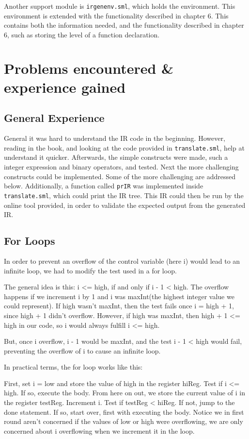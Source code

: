 \documentclass{article}
\begin{document}
Another support module is \texttt{irgenenv.sml}, which holds the environment. This environment is extended with the functionality described in chapter 6. This contains both the information needed, and the functionality described in chapter 6, such as storing the level of a function declaration.

\section{Problems encountered \& experience gained}

\subsection{General Experience}
General it was hard to understand the IR code in the beginning. However, reading in the book, and looking at the code provided in \texttt{translate.sml}, help at understand it quicker. Afterwards, the simple constructs were made, such a integer expression and binary operators, and tested. Next the more challenging constructs could be implemented. Some of the more challenging are addressed below. Additionally, a function called \texttt{prIR} was implemented inside \texttt{translate.sml}, which could print the IR tree. This IR could then be run by the online tool provided, in order to validate the expected output from the generated IR. 

\subsection{For Loops}
In order to prevent an overflow of the control variable (here i) would lead to an infinite loop, we had to modify the test used in a for loop.

The general idea is this: i <= high, if and only if i - 1 < high. The overflow happens if we increment i by 1 and i was maxInt(the highest integer value we could represent). If high wasn't maxInt, then the test fails once i = high + 1, since high + 1 didn't overflow. However, if high was maxInt, then high + 1 <= high in our code, so i would always fulfill i <= high.

But, once i overflow, i - 1 would be maxInt, and the test i - 1 < high would fail, preventing the overflow of i to cause an infinite loop.

In practical terms, the for loop works like this:

First, set i = low and store the value of high in the register hiReg. Test if i <= high. If so, execute the body. From here on out, we store the current value of i in the register testReg. Increment i. Test if testReg < hiReg. If not, jump to the done statement. If so, start over, first with executing the body. Notice we in first round aren't concerned if the values of low or high were overflowing, we are only concerned about i overflowing when we increment it in the loop.
\end{document}
